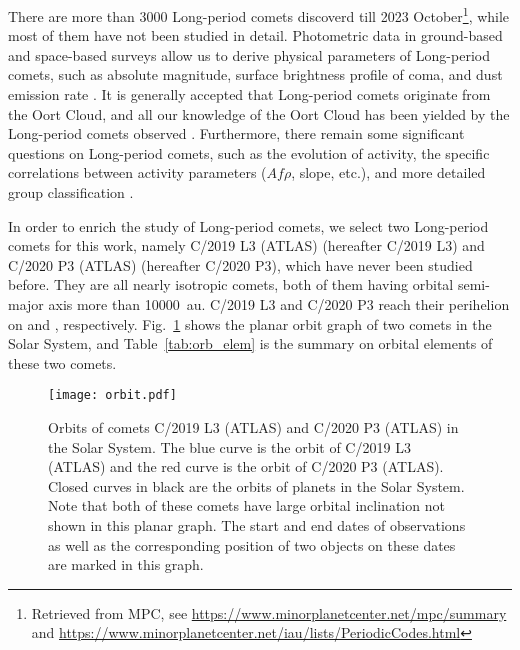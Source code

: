 There are more than \num{3000} Long-period comets discoverd till 2023 October\footnote{Retrieved from MPC, see \url{https://www.minorplanetcenter.net/mpc/summary} and \url{https://www.minorplanetcenter.net/iau/lists/PeriodicCodes.html}}, while most of them have not been studied in detail. Photometric data in ground-based and space-based surveys allow us to derive physical parameters of Long-period comets, such as absolute magnitude, surface brightness profile of coma, and dust emission rate \citep{bauer_comet_2022, betzler_activity_2023}. It is generally accepted that Long-period comets originate from the Oort Cloud, and all our knowledge of the Oort Cloud has been yielded by the Long-period comets observed \citep{fouchard_what_2023}. Furthermore, there remain some significant questions on Long-period comets, such as the evolution of activity, the specific correlations between activity parameters ($Af\rho$, slope, etc.), and more detailed group classification \citep{sarneczky_activity_2016}. 

In order to enrich the study of Long-period comets, we select two Long-period comets for this work, namely C/2019 L3 (ATLAS) (hereafter C/2019 L3) and C/2020 P3 (ATLAS) (hereafter C/2020 P3), which have never been studied before. They are all nearly isotropic comets, both of them having orbital semi-major axis more than {\qty{10000}{\astronomicalunit}}. C/2019 L3 and C/2020 P3 reach their perihelion on  and , respectively. Fig.~\ref{fig:orbit} shows the planar orbit graph of two comets in the Solar System, and Table~\ref{tab:orb_elem} is the summary on orbital elements of these two comets. 

\begin{figure}
    \centering
    \texttt{[image: orbit.pdf]}
    \caption{Orbits of comets C/2019 L3 (ATLAS) and C/2020 P3 (ATLAS) in the Solar System. The blue curve is the orbit of C/2019 L3 (ATLAS) and the red curve is the orbit of C/2020 P3 (ATLAS). Closed curves in black are the orbits of planets in the Solar System. Note that both of these comets have large orbital inclination not shown in this planar graph. The start and end dates of observations as well as the corresponding position of two objects on these dates are marked in this graph. }
    \label{fig:orbit}
\end{figure}

